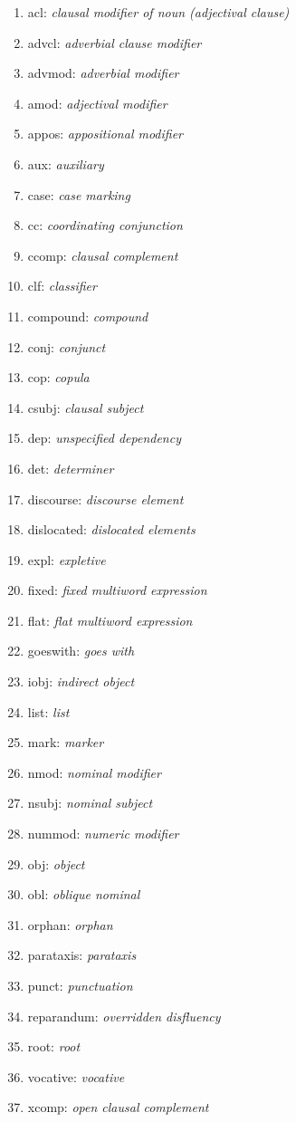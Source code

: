 \begin{multicols}{2}
	\begin{enumerate}
		\item acl: \textit{clausal modifier of noun (adjectival clause)}
		\item advcl: \textit{adverbial clause modifier}
		\item advmod: \textit{adverbial modifier}
		\item amod: \textit{adjectival modifier}
		\item appos: \textit{appositional modifier}
		\item aux: \textit{auxiliary}
		\item case: \textit{case marking}
		\item cc: \textit{coordinating conjunction}
		\item ccomp: \textit{clausal complement}
		\item clf: \textit{classifier}
		\item compound: \textit{compound}
		\item conj: \textit{conjunct}
		\item cop: \textit{copula}
		\item csubj: \textit{clausal subject}
		\item dep: \textit{unspecified dependency}
		\item det: \textit{determiner}
		\item discourse: \textit{discourse element}
		\item dislocated: \textit{dislocated elements}
		\item expl: \textit{expletive}
		\item fixed: \textit{fixed multiword expression}
		\item flat: \textit{flat multiword expression}
		\item goeswith: \textit{goes with}
		\item iobj: \textit{indirect object}
		\item list: \textit{list}
		\item mark: \textit{marker}
		\item nmod: \textit{nominal modifier}
		\item nsubj: \textit{nominal subject}
		\item nummod: \textit{numeric modifier}
		\item obj: \textit{object}
		\item obl: \textit{oblique nominal}
		\item orphan: \textit{orphan}
		\item parataxis: \textit{parataxis}
		\item punct: \textit{punctuation}
		\item reparandum: \textit{overridden disfluency}
		\item root: \textit{root}
		\item vocative: \textit{vocative}
		\item xcomp: \textit{open clausal complement}
	\end{enumerate}
\end{multicols}
